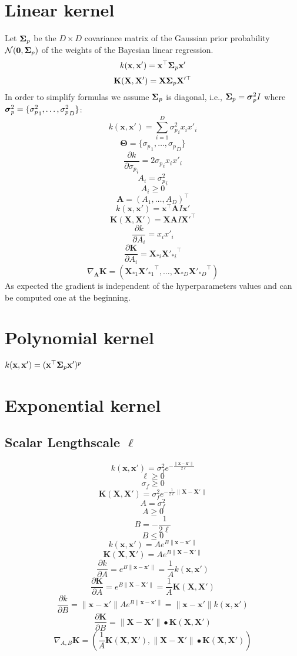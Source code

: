 \documentclass[a4paper,11pt]{article}
\newcommand\x{{\mathbf x}}
\newcommand\X{{\mathbf X}}
\newcommand\K{{\mathbf K}}
\newcommand{\Ivec}[1]{\mbox{\boldmath $#1$}}
\begin{document}
\section{Linear kernel}
Let $\Ivec{\Sigma}_p$ be the $D \times D$ covariance matrix of the Gaussian
prior probability $\mathcal{N}(\Ivec{0},\Ivec{\Sigma}_p)$ of the weights of
the Bayesian linear regression.
$$k(\x,\x') = \x^{\top} \Ivec{\Sigma}_p \x'$$
$$\K(\X,\X') = \X \Ivec{\Sigma}_p \X'^{\top}$$
In order to simplify formulas we assume $\Ivec{\Sigma}_p$ is diagonal, i.e.,
$\Ivec{\Sigma}_p = \Ivec{\sigma}^2_p I$ where $\Ivec{\sigma}^2_p =
\{{\sigma^2_p}_1,\ldots,{\sigma^2_p}_D\}$:
$$k(\x,\x') = \sum_{i=1}^D {\sigma^2_p}_i x_i x'_i$$
$$\mathbf{\Theta} = \{{\sigma_p}_1,\ldots,{\sigma_p}_D\}$$
$$\frac{\partial k}{\partial {\sigma_p}_i} = 2 {\sigma_p}_i x_i x'_i$$
$$A_i = {\sigma_p^2}_i$$
$$A_i \ge 0$$
$$\mathbf{A} = (A_1,\ldots,A_D)^{\top}$$
$$k(\x,\x') = \x^{\top} \mathbf{A}I \x'$$
$$\K(\X,\X') = \X \mathbf{A}I \X'^{\top}$$
$$\frac{\partial k}{\partial A_i} = x_i x'_i$$
$$\frac{\partial \K}{\partial A_i} = \X_{* i} {\X'_{* i}}^{\top}$$
$$\nabla_{\mathbf{A}} \K = ( \X_{* 1} {\X'_{* 1}}^{\top}, \ldots, \X_{* D} {\X'_{* D}}^{\top})$$
As expected the gradient is independent of the hyperparameters values
and can be computed one at the beginning.

\section{Polynomial kernel}
$k(\x,\x') = (\x^{\top} \Ivec{\Sigma}_p \x')^p$

\section{Exponential kernel}
\subsection{Scalar Lengthscale $\ell$}
$$k(\x,\x') = \sigma_f^2 e^{-\frac{\|\x-\x'\|}{2\ell}}$$
$$\ell \ge 0$$
$$\sigma_f \ge 0$$
$$\K(\X,\X') = \sigma_f^2 e^{-\frac{1}{2\ell}\|\X-\X'\|}$$
$$A = \sigma_f^2$$
$$A \ge 0$$
$$B = -\frac{1}{2\ell}$$
$$B \le 0$$
$$k(\x,\x') = A e^{B\|\x-\x'\|}$$
$$\K(\X,\X') = A e^{B\|\X-\X'\|}$$
$$\frac{\partial k}{\partial A} = e^{B\|\x-\x'\|} = \frac{1}{A}k(\x,\x')$$
$$\frac{\partial \K}{\partial A} = e^{B\|\X-\X'\|} = \frac{1}{A} \K(\X,\X')$$
$$\frac{\partial k}{\partial B} = \|\x-\x'\| A e^{B\|\x-\x'\|} =
\|\x-\x'\| k(\x,\x')$$
$$\frac{\partial \K}{\partial B} = \|\X-\X'\| \bullet \K(\X,\X')$$
$$\nabla_{A,B} \K = (\frac{1}{A} \K(\X,\X'), \|\X-\X'\| \bullet
\K(\X,\X'))$$
\end{document}
